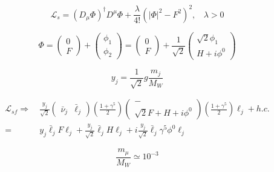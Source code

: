 \documentclass[11pt]{article}
\begin{document}
    \begin{equation}
    \mathcal{L}_s=\left(D_\mu\Phi\right)^\dagger D^\mu\Phi+\frac{\lambda}{4!}\left(\lvert\Phi\rvert^2-F^2\right)^2, \ \ \ \ \lambda>0
    \end{equation}

    \begin{equation}
    \Phi=\begin{pmatrix}0 \\F\end{pmatrix}+\begin{pmatrix}\phi_1 \\\phi_2\end{pmatrix}=\begin{pmatrix}0\\F\end{pmatrix}+\frac{1}{\sqrt{2}}\begin{pmatrix}\sqrt{2}\phi_1 \\H+i\phi^0\end{pmatrix}
    \end{equation}


    \begin{equation}
    y_j=\frac{1}{\sqrt{2}}g\frac{m_j}{M_W}
    \end{equation}

    \begin{equation}
    \begin{split}
    \mathcal{L}_{sf}\Longrightarrow\ &\frac{y_j}{\sqrt{2}}\begin{pmatrix}\bar{\nu}_{j} & \bar{\ell}_{j}\end{pmatrix}\left(\frac{1+\gamma^5}{2}\right)\begin{pmatrix}-\\ \sqrt{2}F+H+i\phi^0\end{pmatrix}\left(\frac{1+\gamma^5}{2}\right)\ell_j+h.c.\\
    =&y_j\bar{\ell}_jF\ell_j+\frac{y_j}{\sqrt{2}}\bar{\ell}_j H \ell_j+i\frac{y_j}{\sqrt{2}}\bar{\ell}_j \gamma^5\phi^0 \ell_j
    \end{split}
    \end{equation}

    \begin{equation}
    \frac{m_{\mu}}{M_W}\simeq 10^{-3}
    \end{equation}
\end{document}
